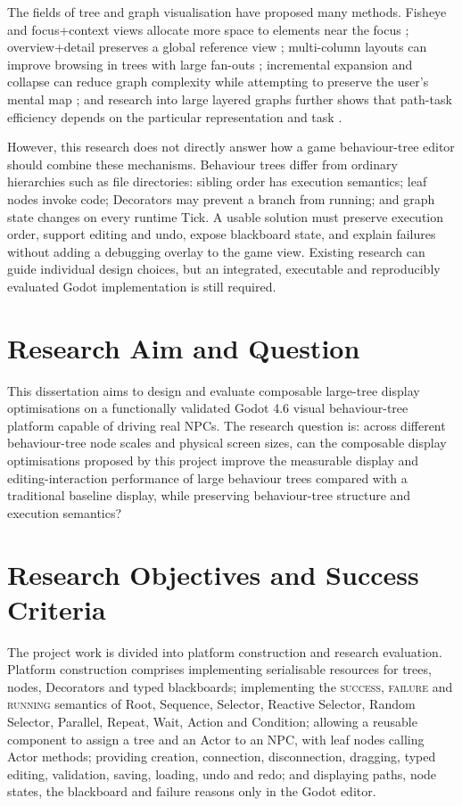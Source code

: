 The fields of tree and graph visualisation have proposed many methods. Fisheye and focus+context views allocate more space to elements near the focus \parencite{furnas1986fisheye,lamping1995hyperbolic}; overview+detail preserves a global reference view \parencite{cockburn2008review}; multi-column layouts can improve browsing in trees with large fan-outs \parencite{song2010largefanout}; incremental expansion and collapse can reduce graph complexity while attempting to preserve the user's mental map \parencite{dogrusoz2018complexity,misue1995mentalmap}; and research into large layered graphs further shows that path-task efficiency depends on the particular representation and task \parencite{bae2011quilts}.

However, this research does not directly answer how a game behaviour-tree editor should combine these mechanisms. Behaviour trees differ from ordinary hierarchies such as file directories: sibling order has execution semantics; leaf nodes invoke code; Decorators may prevent a branch from running; and graph state changes on every runtime Tick. A usable solution must preserve execution order, support editing and undo, expose blackboard state, and explain failures without adding a debugging overlay to the game view. Existing research can guide individual design choices, but an integrated, executable and reproducibly evaluated Godot implementation is still required.

\section{Research Aim and Question}

This dissertation aims to design and evaluate composable large-tree display optimisations on a functionally validated Godot 4.6 visual behaviour-tree platform capable of driving real NPCs. The research question is: across different behaviour-tree node scales and physical screen sizes, can the composable display optimisations proposed by this project improve the measurable display and editing-interaction performance of large behaviour trees compared with a traditional baseline display, while preserving behaviour-tree structure and execution semantics?

\section{Research Objectives and Success Criteria}

The project work is divided into platform construction and research evaluation. Platform construction comprises implementing serialisable resources for trees, nodes, Decorators and typed blackboards; implementing the \textsc{success}, \textsc{failure} and \textsc{running} semantics of Root, Sequence, Selector, Reactive Selector, Random Selector, Parallel, Repeat, Wait, Action and Condition; allowing a reusable component to assign a tree and an Actor to an NPC, with leaf nodes calling Actor methods; providing creation, connection, disconnection, dragging, typed editing, validation, saving, loading, undo and redo; and displaying paths, node states, the blackboard and failure reasons only in the Godot editor.

